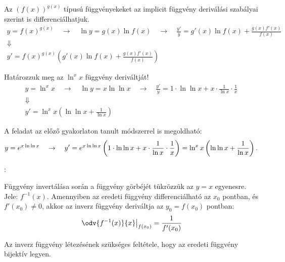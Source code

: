 \documentclass[a4paper, 12pt]{scrartcl}
\begin{document}
\begin{note}
  Az $(f(x))^{g(x)}$ típusú függvényekeket az implicit függvény deriválási
  szabályai szerint is differenciálhatjuk.
  \begin{gather*}
    y = f(x)^{g(x)}
    \quad \rightarrow \quad
    \ln y = g(x) \ln f(x)
    \quad \rightarrow \quad
    \frac{y'}{y} = g'(x) \ln f(x) + \frac{g(x) f'(x)}{f(x)}
    \\
    \Downarrow
    \\
    y' = f(x)^{g(x)} \left( g'(x) \ln f(x) + \frac{g(x) f'(x)}{f(x)} \right)
  \end{gather*}
\end{note}

\begin{note}
  Határozzuk meg az $\ln^x x$ függvény deriváltját!
  \begin{gather*}
    y = \ln^x x
    \quad \rightarrow \quad
    \ln y = x \ln \ln x
    \quad \rightarrow \quad
    \frac{y'}{y} = 1 \cdot \ln \ln x + x \cdot \frac{1}{\ln x} \cdot \frac{1}{x}
    \\
    \Downarrow
    \\
    y' = \ln^x x \left( \ln \ln x + \frac{1}{\ln x} \right)
  \end{gather*}

  A feladat az előző gyakorlaton tanult módszerrel is megoldható:
  \[
    y = e^{x \ln \ln x}
    \quad \rightarrow \quad
    y' = e^{x \ln \ln x} \left( 1 \cdot \ln \ln x + x \cdot \frac{1}{\ln x} \cdot \frac{1}{x} \right)
    = \ln^x x \left( \ln \ln x + \frac{1}{\ln x} \right)
    \text.
  \]
\end{note}

\begin{blueBox}
  :

  Függvény invertálása során a függvény görbéjét tükrözzük az $y = x$ egyenesre.
  Jele: $f^{-1}(x)$. Amennyiben az eredeti függvény differenciálható az $x_0$
  pontban, és $f'(x_0) \neq 0$, akkor az inverz függvény deriváltja az
  $y_0 = f(x_0)$ pontban:
  \[
    \left. \odv{f^{-1}(x)}{x} \right|_{f(x_0)} = \frac{1}{f'(x_0)}
  \]
\end{blueBox}

\begin{note}
  Az inverz függvény létezésének szükséges feltétele, hogy az eredeti függvény
  bijektív legyen.
\end{note}
\end{document}
